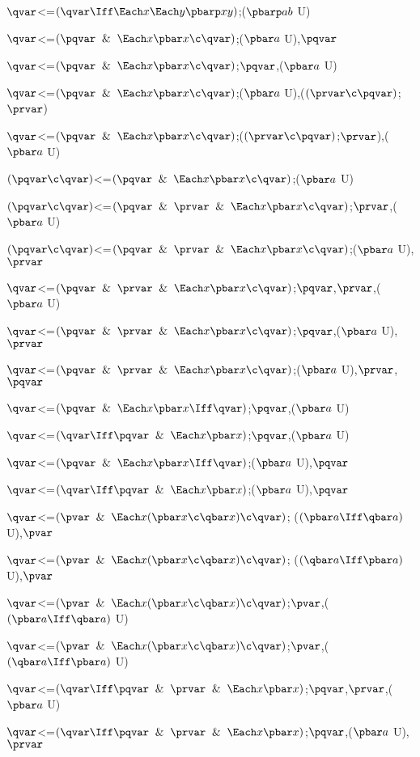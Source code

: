 $\qvar$<=$(\qvar \Iff \Each x \Each y \pbarp xy)$;($\pbarp ab$ U)

$\qvar$<=$(\pqvar \And \Each x \pbar x\c \qvar)$;($\pbar a$ U),$\pqvar$

$\qvar$<=$(\pqvar \And \Each x \pbar x\c \qvar)$;$\pqvar$,($\pbar a$ U)

$\qvar$<=$(\pqvar \And \Each x \pbar x\c \qvar)$;($\pbar a$ U),($(\prvar\c\pqvar)$;$\prvar$)

$\qvar$<=$(\pqvar \And \Each x \pbar x\c \qvar)$;($(\prvar\c\pqvar)$;$\prvar$),($\pbar a$ U)

$(\pqvar \c \qvar)$<=$(\pqvar \And \Each x \pbar x\c \qvar)$;($\pbar a$ U)

$(\pqvar \c\qvar)$<=$(\pqvar \And \prvar \And \Each x \pbar x\c \qvar)$;$\prvar$,($\pbar a$ U)

$(\pqvar \c \qvar)$<=$(\pqvar \And \prvar \And \Each x \pbar x\c \qvar)$;($\pbar a$ U),$\prvar$

$\qvar$<=$(\pqvar \And \prvar \And \Each x \pbar x\c \qvar)$;$\pqvar$,$\prvar$,($\pbar a$ U)

$\qvar$<=$(\pqvar \And \prvar \And \Each x \pbar x\c \qvar)$;$\pqvar$,($\pbar a$ U),$\prvar$

$\qvar$<=$(\pqvar \And \prvar \And \Each x \pbar x\c \qvar)$;($\pbar a$ U),$\prvar$,$\pqvar$

$\qvar$<=$(\pqvar \And \Each x \pbar x\Iff \qvar)$;$\pqvar$,($\pbar a$ U)

$\qvar$<=$(\qvar \Iff \pqvar \And \Each x \pbar x)$;$\pqvar$,($\pbar a$ U)

$\qvar$<=$(\pqvar \And \Each x \pbar x\Iff \qvar)$;($\pbar a$ U),$\pqvar$

$\qvar$<=$(\qvar \Iff \pqvar \And \Each x \pbar x)$;($\pbar a$ U),$\pqvar$

$\qvar$<=$(\pvar \And \Each x (\pbar x \c \qbar x) \c \qvar)$; ($(\pbar a \Iff \qbar a)$ U),$\pvar$

$\qvar$<=$(\pvar \And \Each x (\pbar x \c \qbar x) \c \qvar)$; ($(\qbar a \Iff \pbar a)$ U),$\pvar$

$\qvar$<=$(\pvar \And \Each x (\pbar x \c \qbar x) \c \qvar)$;$\pvar$,($(\pbar a \Iff \qbar a)$ U)

$\qvar$<=$(\pvar \And \Each x (\pbar x \c \qbar x) \c \qvar)$;$\pvar$,($(\qbar a \Iff \pbar a)$ U)

$\qvar$<=$(\qvar \Iff\pqvar \And \prvar\And \Each x\pbar x)$;$\pqvar$,$\prvar$,($\pbar a$ U)

$\qvar$<=$(\qvar \Iff\pqvar \And \prvar\And \Each x\pbar x)$;$\pqvar$,($\pbar a$ U),$\prvar$

